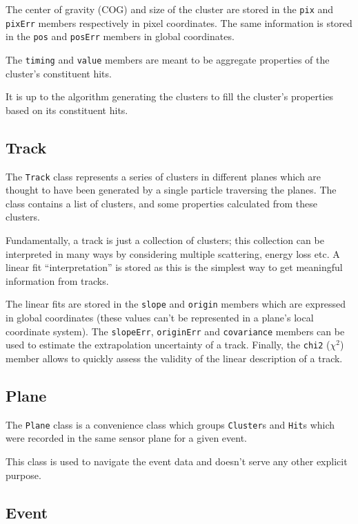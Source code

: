\documentclass[10pt,a4paper]{book}
\begin{document}
The center of gravity (COG) and size of the cluster are stored in the \Verb`pix` and \Verb`pixErr` members respectively in pixel coordinates. The same information is stored in the \Verb`pos` and \Verb`posErr` members in global coordinates.

The \Verb`timing` and \Verb`value` members are meant to be aggregate properties of the cluster's constituent hits.

It is up to the algorithm generating the clusters to fill the cluster's properties based on its constituent hits.

\subsection{Track}

The \Verb`Track` class represents a series of clusters in different planes which are thought to have been generated by a single particle traversing the planes. The class contains a list of clusters, and some properties calculated from these clusters.

Fundamentally, a track is just a collection of clusters; this collection can be interpreted in many ways by considering multiple scattering, energy loss etc. A linear fit ``interpretation'' is stored as this is the simplest way to get meaningful information from tracks.

The linear fits are stored in the \Verb`slope` and \Verb`origin` members which are expressed in global coordinates (these values can't be represented in a plane's local coordinate system). The \Verb`slopeErr`, \Verb`originErr` and \Verb`covariance` members can be used to estimate the extrapolation uncertainty of a track. Finally, the \Verb`chi2` ($\chi^2$) member allows to quickly assess the validity of the linear description of a track.

\subsection{Plane}

The \Verb`Plane` class is a convenience class which groups \Verb`Cluster`s and \Verb`Hit`s which were recorded in the same sensor plane for a given event.

This class is used to navigate the event data and doesn't serve any other explicit purpose.

\subsection{Event}
\end{document}
